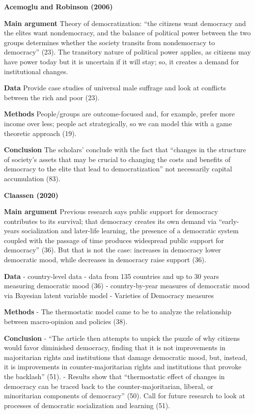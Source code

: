 \documentclass[
  english,
  man]{apa6}
\begin{document}
\textbf{Acemoglu and Robinson (2006)}

\textbf{Main argument}
Theory of democratization: ``the citizens want democracy and the elites want nondemocracy, and the balance of political power between the two groups determines whether the society transits from nondemocracy to democracy'' (23). The transitory nature of political power applies, as citizens may have power today but it is uncertain if it will stay; so, it creates a demand for institutional changes.

\textbf{Data}
Provide case studies of universal male suffrage and look at conflicts between the rich and poor (23).

\textbf{Methods}
People/groups are outcome-focused and, for example, prefer more income over less; people act strategically, so we can model this with a game theoretic approach (19).

\textbf{Conclusion}
The scholars' conclude with the fact that ``changes in the structure of society's assets that may be crucial to changing the costs and benefits of democracy to the elite that lead to democratization'' not necessarily capital accumulation (83).

\textbf{Claassen (2020)}

\textbf{Main argument}
Previous research says public support for democracy contributes to its survival; that democracy creates its own demand via ``early-years socialization and later-life learning, the presence of a democratic system coupled with the passage of time produces widespread public support for democracy'' (36). But that is not the case: increases in democracy lower democratic mood, while decreases in democracy raise support (36).

\textbf{Data}
- country-level data
- data from 135 countries and up to 30 years measuring democratic mood (36)
- country-by-year measures of democratic mood via Bayesian latent variable model
- Varieties of Democracy measures

\textbf{Methods}
- The thermostatic model came to be to analyze the relationship between macro-opinion and policies (38).

\textbf{Conclusion}
- ``The article then attempts to unpick the puzzle of why citizens would favor diminished democracy, finding that it is not improvements in majoritarian rights and institutions that damage democratic mood, but, instead, it is improvements in counter-majoritarian rights and institutions that provoke the backlash'' (51).
- Results show that ``thermostatic effect of changes in democracy can be traced back to the counter-majoritarian, liberal, or minoritarian components of democracy'' (50). Call for future research to look at processes of democratic socialization and learning (51).
\end{document}
